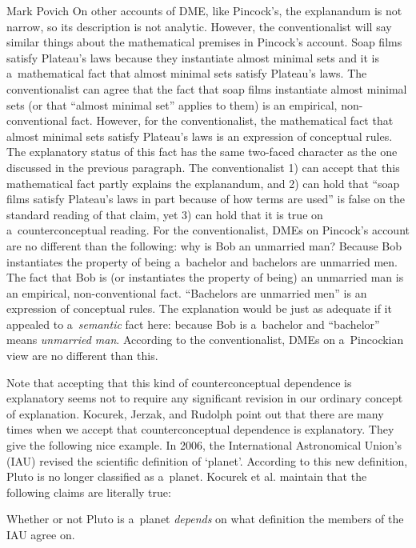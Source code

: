 \begin{artengenv}{Mark Povich}
On other accounts of DME, like Pincock's, the explanandum is not narrow, so its description is not analytic. However, the conventionalist will say similar things about the mathematical premises in Pincock's account. Soap films satisfy Plateau's laws because they instantiate almost minimal sets and it is a~mathematical fact that almost minimal sets satisfy Plateau's laws. The conventionalist can agree that the fact that soap films instantiate almost minimal sets (or that ``almost minimal set'' applies to them) is an empirical, non-conventional fact. However, for the conventionalist, the mathematical fact that almost minimal sets satisfy Plateau's laws is an expression of conceptual rules. The explanatory status of this fact has the same two-faced character as the one discussed in the previous paragraph. The conventionalist 1) can accept that this mathematical fact partly explains the explanandum, and 2) can hold that ``soap films satisfy Plateau's laws in part because of how terms are used'' is false on the standard reading of that claim, yet 3) can hold that it is true on a~counterconceptual reading. For the conventionalist, DMEs on Pincock's account are no different than the following: why is Bob an unmarried man? Because Bob instantiates the property of being a~bachelor and bachelors are unmarried men. The fact that Bob is (or instantiates the property of being) an unmarried man is an empirical, non-conventional fact. ``Bachelors are unmarried men'' is an expression of conceptual rules. The explanation would be just as adequate if it appealed to a~\textit{semantic} fact here: because Bob is a~bachelor and ``bachelor'' means \textit{unmarried man}. According to the conventionalist, DMEs on a~Pincockian view are no different than this.

Note that accepting that this kind of counterconceptual dependence is explanatory seems not to require any significant revision in our ordinary concept of explanation. Kocurek, Jerzak, and Rudolph
\parencite*[][p.7]{kocurek_against_2020} %
 point out that there are many times when we accept that counterconceptual dependence is explanatory. They give the following nice example. In 2006, the International Astronomical Union's (IAU) revised the scientific definition of ‘planet'. According to this new definition, Pluto is no longer classified as a~planet. Kocurek et al. maintain that the following claims are literally true:

Whether or not Pluto is a~planet \textit{depends} on what definition the members of the IAU agree on.


\end{artengenv}
